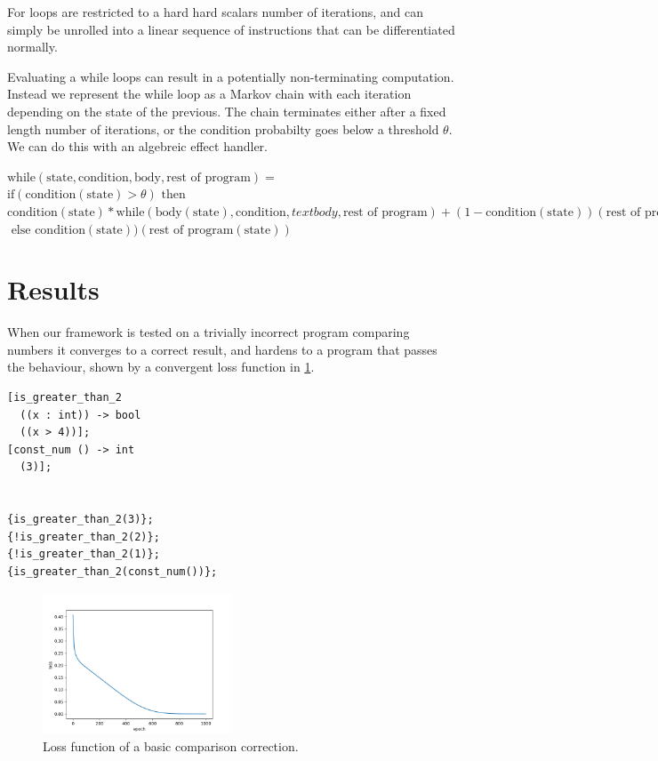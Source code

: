 \documentclass{article}
\begin{document}
For loops are restricted to a hard hard scalars number of iterations, and can simply be unrolled into a linear sequence of instructions that can be differentiated normally.

Evaluating a while loops can result in a potentially non-terminating computation. Instead we represent the while loop as a Markov chain with each iteration depending on the state of the previous. The chain terminates either after a fixed length number of iterations, or the condition probabilty goes below a threshold $\theta$. We can do this with an algebreic effect handler.

\begin{center}
  $\text{while}(\text{state}, \text{condition}, \text{body}, \text{rest of program}) =$\\
  $\text{if}(\text{condition}(\text{state}) > \theta) \text{ then }$\\
  $\text{condition}(\text{state}) * \text{while}(\text{body}(\text{state}), \text{condition}, text{body}, \text{rest of program}) + (1 - \text{condition}(\text{state}))(\text{rest of program}(\text{state}))$\\
  $\text{ else } \text{condition}(\text{state}))(\text{rest of program}(\text{state}))$
\end{center}

\section{Results}
\begin{minipage}{\textwidth}
When our framework is tested on a trivially incorrect program comparing numbers it converges to a correct result, and hardens to a program that passes the behaviour, shown by a convergent loss function in \ref{fig:trivial}.
\begin{verbatim}
[is_greater_than_2
  ((x : int)) -> bool
  ((x > 4))];
[const_num () -> int
  (3)];


{is_greater_than_2(3)};
{!is_greater_than_2(2)};
{!is_greater_than_2(1)};
{is_greater_than_2(const_num())};
\end{verbatim}
\end{minipage}
\begin{figure}[h!]
  \begin{center}
    \includegraphics[width=0.5\textwidth]{trivial.png}
  \end{center}
  \caption{Loss function of a basic comparison correction.}
  \label{fig:trivial}
\end{figure}
\end{document}
